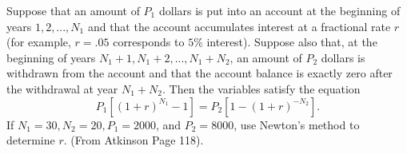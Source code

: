\begin{problem}
Suppose that an amount of $P_1$ dollars is put into an account at the beginning of years $1, 2,..., N_1$ and that the account accumulates interest at a fractional rate $r$ (for example, $r = .05$ corresponds to $5\%$ interest).
Suppose also that, at the beginning of years $N_1 + 1, N_1 + 2, ..., N_1 + N_2$, an amount of $P_2$ dollars is withdrawn from the account and that the account balance is exactly zero after the withdrawal at year $N_1 + N_2$.
Then the variables satisfy the equation
\[
P_1[(1+r)^{N_1} - 1] = P_2[1-(1+r)^{-N_2}].
\]
If $N_1 =30, N_2 =20, P_1 =2000$, and $P_2 =8000$, use Newton's method to
determine $r$.
(From Atkinson Page 118).
\end{problem}

